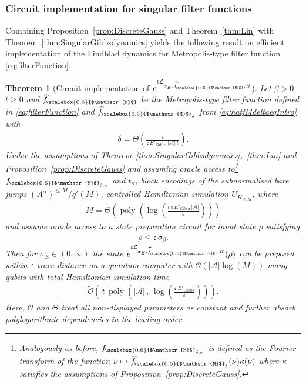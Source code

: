 \documentclass[11pt]{amsart}
\newcommand{\1}{\mathbbm{1}}
\newcommand{\cL}{\mathcal{L}}
\newcommand{\eps}{\varepsilon}
\renewcommand{\epsilon}{\varepsilon}
\newcommand{\cA}{\mathcal{A}}
\newcommand{\hatfM}{\widehat{f}_{\!\scalebox{0.6}{$\mathscr{M}$}}
}
\newcommand{\hatfMdelta}{\widehat{f}_{\!\scalebox{0.6}{$\mathscr{M}$}_\delta}}
\newcommand{\fMdeltakappa}{f_{\!\scalebox{0.6}{$\mathscr{M}$}_{\delta,\kappa}}}
\theoremstyle{plain}
\newtheorem{theorem}{Theorem}[section]
\theoremstyle{definition}
\theoremstyle{remark}
\numberwithin{equation}{section}
\begin{document}
\subsubsection{Circuit implementation for singular filter functions}
Combining Proposition~\ref{prop:DiscreteGauss} and Theorem~\ref{thm:Lin} with Theorem~\ref{thm:SingularGibbsdynamics} yields the following result on efficient implementation of the Lindblad dynamics for Metropolis-type filter function \eqref{eq:filterFunction}. 
\begin{theorem}[Circuit implementation of $e^{t\cL_{\sigma_E,\hatfM,H}}$]
\label{thm:CircuitDynamicsSingular}
Let $\beta>0,$ $t\ge 0$ and $\hatfM$ be the Metropolis-type filter function defined in \eqref{eq:filterFunction} and $\hatfMdelta$ from \eqref{eq:hatfMdeltaeqIntro} with
\begin{align}
\label{eq:deltCircuit}
    \delta = \Theta\left(\frac{\eps}{\mathfrak{c}\,E'_{\operatorname{Gibbs}}\,|\cA|\,t} \right).
\end{align}
 Under the assumptions of Theorem~\ref{thm:SingularGibbsdynamics},~\ref{thm:Lin} and  Proposition~\ref{prop:DiscreteGauss} and assuming oracle access to\footnote{Analogously as before, $\fMdeltakappa$ is defined as the Fourier transform of the function $\nu\mapsto\hatfMdelta(\nu)\kappa(\nu)$ where $\kappa$ satisfies the assumptions of Proposition~\ref{prop:DiscreteGauss}.} $\fMdeltakappa$  and  $t_\kappa$, block encodings of the subnormalised bare jumps $(A^{\alpha})^{\le M}/q'(M)$, controlled Hamiltonian simulation $U_{H_{\le M}}$, where 
\begin{align}
\label{eq:MDimension1}
 M =\widetilde\Theta\left(\operatorname{poly}\left(\log\left(\frac{t\,\mathfrak{c}\,E'_{\operatorname{Gibbs}}|\cA|}{ \eps}\right)\right)\right)
    \end{align}
    and assume oracle access to a state preparation circuit for input state $\rho$ satisfying
    \begin{align*}
        \rho \le \mathfrak{c}\, \sigma_\beta.
    \end{align*}
Then for $\sigma_E\in(0,\infty)$ the state $e^{t\cL_{\sigma_E,\hatfM, H}}(\rho)$ can be prepared within $\eps$-trace distance on a quantum computer with $\mathcal{O}\left(|\cA|\log(M)\right)$ many qubits with total Hamiltonian simulation time 
    \begin{align*}
\widetilde{\mathcal{O}}\left( \,t\,\operatorname{poly}\left(|\mathcal{A}|\,,\, \log\left(\frac{\mathfrak{c}\,E'_{\operatorname{Gibbs}}}{\epsilon}\right)\right)\right).
    \end{align*} 
Here, $\widetilde{\mathcal{O}}$ and $\widetilde\Theta$ treat all non-displayed parameters as constant
and further absorb  polylogarithmic dependencies in the leading order.
\end{theorem}
\end{document}
